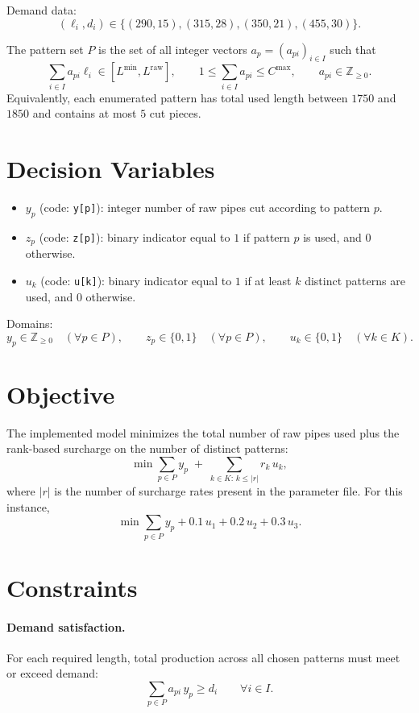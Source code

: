 Demand data:
\[
(\ell_i,d_i)\in\{(290,15),(315,28),(350,21),(455,30)\}.
\]

The pattern set $P$ is the set of all integer vectors $a_p=(a_{pi})_{i\in I}$ such that
\[
\sum_{i\in I} a_{pi}\ell_i \in [L^{\min},L^{\text{raw}}],
\qquad
1 \le \sum_{i\in I} a_{pi} \le C^{\max},
\qquad
a_{pi}\in \mathbb{Z}_{\ge 0}.
\]
Equivalently, each enumerated pattern has total used length between $1750$ and $1850$ and contains at most $5$ cut pieces.

\section*{Decision Variables}

\begin{itemize}
    \item $y_p$ (code: \texttt{y[p]}): integer number of raw pipes cut according to pattern $p$.
    \item $z_p$ (code: \texttt{z[p]}): binary indicator equal to $1$ if pattern $p$ is used, and $0$ otherwise.
    \item $u_k$ (code: \texttt{u[k]}): binary indicator equal to $1$ if at least $k$ distinct patterns are used, and $0$ otherwise.
\end{itemize}

Domains:
\[
y_p\in \mathbb{Z}_{\ge 0}\quad(\forall p\in P),\qquad
z_p\in\{0,1\}\quad(\forall p\in P),\qquad
u_k\in\{0,1\}\quad(\forall k\in K).
\]

\section*{Objective}

The implemented model minimizes the total number of raw pipes used plus the rank-based surcharge on the number of distinct patterns:
\[
\min \sum_{p\in P} y_p \;+\; \sum_{k\in K:\,k\le |r|} r_k\,u_k,
\]
where $|r|$ is the number of surcharge rates present in the parameter file. For this instance,
\[
\min \sum_{p\in P} y_p + 0.1\,u_1 + 0.2\,u_2 + 0.3\,u_3.
\]

\section*{Constraints}

\paragraph{Demand satisfaction.}
For each required length, total production across all chosen patterns must meet or exceed demand:
\[
\sum_{p\in P} a_{pi}\,y_p \ge d_i
\qquad \forall i\in I.
\]

